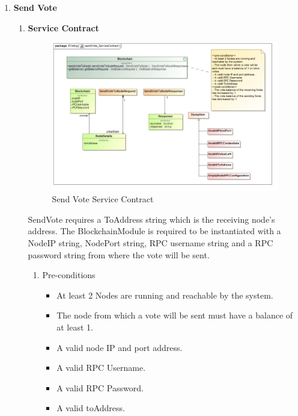 \begin{enumerate}
	\item \textbf{Send Vote}
		\begin{enumerate}
			\item \textbf{Service Contract}
				\begin{figure}[H]
					\centering
					\includegraphics[width=0.75\linewidth]{../Images/Blockchain/ServiceContracts/sendVote_ServiceContract.jpg}
					\caption{Send Vote Service Contract}
				\end{figure}
				
				SendVote requires a ToAddress string which is the receiving node's address. The BlockchainModule is required to be instantiated with a NodeIP string, NodePort string, RPC username string and a RPC password string from where the vote will be sent.
				\newline				
				
				\begin{enumerate}
					\item Pre-conditions
					\begin{itemize}
						\item At least 2 Nodes are running and reachable by the system.
						\item The node from which a vote will be sent must have a balance of at least 1.
						\item A valid node IP and port address.
						\item A valid RPC Username.
						\item A valid RPC Password.
						\item A valid toAddress.
					\end{itemize}
					

\end{enumerate}
\end{enumerate}
\end{enumerate}
